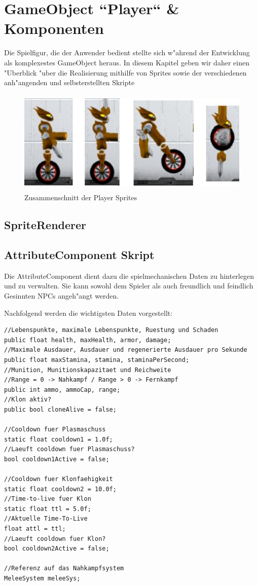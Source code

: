 \chapter{GameObject ``Player`` \& Komponenten}

Die Spielfigur, die der Anwender bedient stellte sich w"ahrend der Entwicklung als komplexestes GameObject heraus. In diesem Kapitel geben wir daher einen "Uberblick "uber die Realisierung mithilfe von Sprites sowie der verschiedenen anh"angenden und selbsterstellten Skripte

\begin{figure}
	\centering
	\includegraphics[height=5cm]{images/AnimationenZusammenschnitt.jpg}
	\caption{Zusammenschnitt der Player Sprites}
	\label{fig:playerSprites}
\end{figure}

\section{SpriteRenderer}

\section{AttributeComponent Skript}
Die AttributeComponent dient dazu die spielmechanischen Daten zu hinterlegen und zu verwalten. Sie kann sowohl dem Spieler als auch freundlich und feindlich Gesinnten NPCs angeh"angt werden. 

Nachfolgend werden die wichtigsten Daten vorgestellt:
\begin{lstlisting}[breaklines=true]
//Lebenspunkte, maximale Lebenspunkte, Ruestung und Schaden
public float health, maxHealth, armor, damage;
//Maximale Ausdauer, Ausdauer und regenerierte Ausdauer pro Sekunde
public float maxStamina, stamina, staminaPerSecond;
//Munition, Munitionskapazitaet und Reichweite
//Range = 0 -> Nahkampf / Range > 0 -> Fernkampf
public int ammo, ammoCap, range;
//Klon aktiv?
public bool cloneAlive = false;

//Cooldown fuer Plasmaschuss
static float cooldown1 = 1.0f;
//Laeuft cooldown fuer Plasmaschuss?
bool cooldown1Active = false;

//Cooldown fuer Klonfaehigkeit
static float cooldown2 = 10.0f;
//Time-to-live fuer Klon
static float ttl = 5.0f;
//Aktuelle Time-To-Live
float attl = ttl;
//Laeuft cooldown fuer Klon?
bool cooldown2Active = false;

//Referenz auf das Nahkampfsystem
MeleeSystem meleeSys;
\end{lstlisting}

